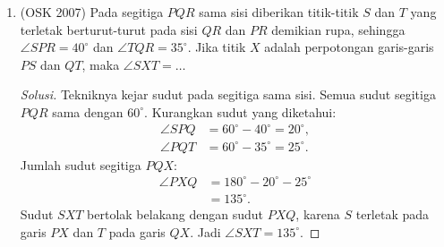 \documentclass[12pt]{scrartcl}
\begin{document}
\begin{enumerate}
	\item (OSK 2007)
	Pada segitiga $PQR$ sama sisi diberikan titik-titik $S$ dan $T$ yang
	terletak berturut-turut pada sisi $QR$ dan $PR$ demikian rupa,
	sehingga $\angle SPR=40^{\circ}$ dan $\angle TQR=35^{\circ}$. Jika
	titik $X$ adalah perpotongan garis-garis $PS$ dan $QT$, maka
	$\angle SXT=\dots$
\begin{center}
\end{center}
	\begin{proof}[Solusi]
	Tekniknya kejar sudut pada segitiga sama sisi. Semua sudut segitiga
	$PQR$ sama dengan $60^\circ$. Kurangkan sudut yang diketahui:
	\begin{align*}
	\angle SPQ &= 60^\circ - 40^\circ = 20^\circ, \\
	\angle PQT &= 60^\circ - 35^\circ = 25^\circ.
	\end{align*}
	Jumlah sudut segitiga $PQX$:
	\begin{align*}
	\angle PXQ &= 180^\circ - 20^\circ - 25^\circ \\
	&= 135^\circ.
	\end{align*}
	Sudut $SXT$ bertolak belakang dengan sudut $PXQ$, karena $S$
	terletak pada garis $PX$ dan $T$ pada garis $QX$. Jadi
	$\angle SXT = 135^\circ$.
	\end{proof}


\end{enumerate}
\end{document}
